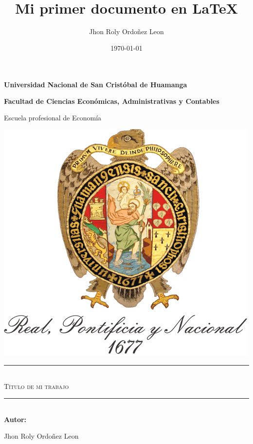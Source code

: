 \documentclass[12pt]{article}
\title{Mi primer documento en \LaTeX}
\author{Jhon Roly Ordoñez Leon}
\date{\today}
\begin{document}
    \begin{titlepage}
        \begin{center}
            {\bf \large Universidad Nacional de San Cristóbal de Huamanga }\par 
            \vspace{2mm}
            {\bf \small Facultad de Ciencias Económicas, Administrativas y Contables}\par 
            \vspace{2mm}
            {\small Escuela profesional de Economía} \par 
            \vspace{4mm}
             \includegraphics[scale = 1.2]{Imágenes/logo-unsch.png}
            \vspace{2mm}
            {\textcolor{azul1}{\rule{\linewidth}{0.50mm}}}\\
              \vspace{3mm}
               {\scshape \huge Título de mi trabajo}\\
              \vspace{3mm}
            {\textcolor{azul1}{\rule{\linewidth}{0.50mm}}}\\
            \vspace{1cm}
            {\bf \Large Autor:}\par 
            \vspace{2mm}
            {\large Jhon Roly Ordoñez Leon} \par 

\end{center}
\end{titlepage}
\end{document}
